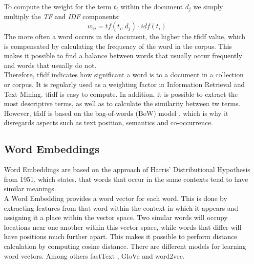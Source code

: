 \documentclass[a4paper, 11pt,titlepage,oneside,openany]{book}
\begin{document}
\indent To compute the weight for the term $t_i$ within the document $d_j$ we simply multiply the \textit{TF} and \textit{IDF} components:
\[
w_{ij}=tf(t_i, d_j)\cdot idf(t_i)
\]
\indent The more often a word occurs in the document, the higher the \gls{tfidf} value, which is compensated by calculating the frequency of the word in the corpus. This makes it possible to find a balance between words that usually occur frequently and words that usually do not.\\
\newpage
Therefore, \Gls{tfidf} indicates how significant a word is to a document in a collection or corpus. It is regularly used as a weighting factor in Information Retrieval and Text Mining. \Gls{tfidf} is easy to compute. In addition, it is possible to extract the most descriptive terms, as well as to calculate the similarity between tw terms. However, \gls{tfidf} is based on the bag-of-words (BoW) model \cite{distributionalhypothesis}, which is why it disregards aspects such as text position, semantics and co-occurrence.

\subsection{Word Embeddings}
\indent Word Embeddings are based on the approach of Harris' Distributional Hypothesis \cite{distributionalhypothesis} from 1951, which states, that words that occur in the same contexts tend to have similar meanings. \\
\indent A Word Embedding provides a word vector for each word. This is done by extracting features from that word within the context in which it appears and assigning it a place within the vector space. Two similar words will occupy locations near one another within this vector space, while words that differ will have positions much further apart. This makes it possible to perform distance calculation by computing cosine distance. There are different models for learning word vectors. Among others fastText \cite{fasttext}, GloVe \cite{glove} and word2vec. \\
\end{document}
